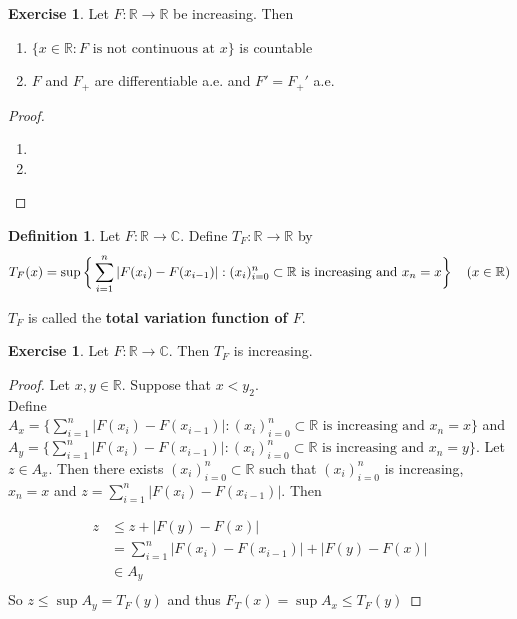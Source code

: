 \documentclass[12pt]{amsart}
\theoremstyle{definition}
\newtheorem{defn}[definition]{Definition}
\newtheorem{ex}[definition]{Exercise}
\newcommand{\C}{\mathbb{C}}
\newcommand{\R}{\mathbb{R}}
\newcommand{\lex}[1]{\label{ex:#1}}
\newcommand{\ld}[1]{\label{defn:#1}}
\begin{document}
	\begin{ex}
		Let $F:\R \rightarrow \R$ be increasing. Then 
		\begin{enumerate}
			\item $\{x \in \R: F \text{ is not continuous at }x\}$ is countable
			\item $F$ and $F_+$ are differentiable a.e. and $F' = F_+'$ a.e.
		\end{enumerate}
	\end{ex}

	\begin{proof}\
		\begin{enumerate}
			\item 
			\item 
		\end{enumerate}
	\end{proof}
	
	\begin{defn} \ld{00000} 
		Let $F:\R \rightarrow \C$. Define $T_F:\R \rightarrow \R$ by $$T_F(x) = \sup\bigg \{\sum_{i=1}^{n}|F(x_{i}) - F(x_{i-1})|: (x_i)_{i=0}^n \subset \R \text{ is increasing and } x_n=x  \bigg \} \hspace{4mm} (x \in \R)$$
		
		$T_F$ is called the \textbf{total variation function of $F$}.
	\end{defn}
	
	\begin{ex} \lex{00000} 
		Let $F:\R \rightarrow \C$. Then $T_F$ is increasing.
	\end{ex}
	
	\begin{proof}
		Let $x,y \in \R$. Suppose that $x<y_2$. \\Define  $A_x = \big \{\sum_{i=1}^{n}|F(x_{i}) - F(x_{i-1})|: (x_i)_{i=0}^n \subset \R \text{ is increasing and } x_n=x  \big \}$ and \\$A_y = \big \{\sum_{i=1}^{n}|F(x_{i}) - F(x_{i-1})|: (x_i)_{i=0}^n \subset \R \text{ is increasing and } x_n=y  \big \}$. Let $z \in A_x$. Then there exists $(x_i)_{i=0}^n \subset \R$ such that $(x_i)_{i=0}^n$ is increasing,\\ $x_n=x$ and $z = \sum_{i=1}^n |F(x_{i}) - F(x_{i-1})|$. Then
		
		\begin{align*}
			z 
			& \leq z+|F(y)-F(x)|\\
			&= \sum_{i=1}^n |F(x_{i}) - F(x_{i-1})| + |F(y)-F(x)|\\
			& \in A_y\\
		\end{align*} 
		So $z \leq \sup A_y = T_F(y) $ and thus $F_T(x)  = \sup A_x \leq T_F(y)$
	\end{proof}
	
\end{document}
